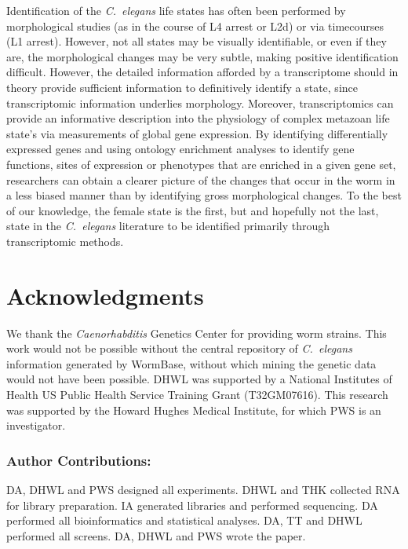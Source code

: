 \documentclass[10pt,letterpaper,twocolumn]{article}
\newcommand{\cel}{\emph{C.~elegans}}
\begin{document}
Identification of the \cel{} life states has often been performed by
morphological studies (as in the course of L4 arrest or L2d) or via
timecourses (L1 arrest). However, not all states may be visually identifiable,
or even if they are, the morphological changes may be very subtle, making
positive identification difficult. However, the detailed information afforded
by a transcriptome should in theory provide sufficient information to
definitively identify a state, since transcriptomic information underlies
morphology. Moreover, transcriptomics can provide an informative description
into the physiology of complex metazoan life state's via measurements of global
gene expression. By identifying differentially expressed genes and using
ontology enrichment analyses to identify gene functions, sites of expression
or phenotypes that are enriched in a given gene set, researchers can obtain a
clearer picture of the changes that occur in the worm in a less biased manner
than by identifying gross morphological changes. To the best of our knowledge,
the female state is the first, but and hopefully not the last, state in the
\cel{} literature to be identified primarily through transcriptomic methods.

\section*{Acknowledgments}

We thank the \emph{Caenorhabditis} Genetics Center for providing worm strains.
This work would not be possible without the central repository of \cel{}
information generated by WormBase, without which mining the genetic data would
not have been possible. DHWL was supported by a National Institutes of Health
US Public Health Service Training Grant (T32GM07616). This research was
supported by the Howard Hughes Medical Institute, for which PWS is an
investigator.

\subsubsection*{Author Contributions:}
DA, DHWL and PWS designed all experiments. DHWL and THK collected RNA for
library preparation. IA generated libraries and performed sequencing.
DA performed all bioinformatics and statistical analyses.
DA, TT and DHWL performed all screens. DA, DHWL and PWS wrote the paper.

\nolinenumbers{}




\end{document}
